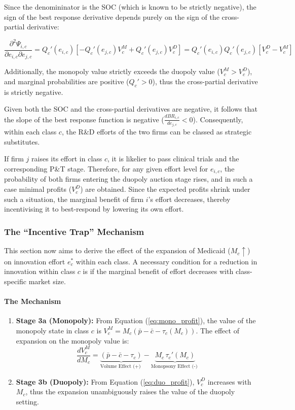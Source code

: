 \documentclass[12pt]{article}
\begin{document}
Since the denomininator is the SOC (which is known to be strictly negative), the sign of the best response derivative depends purely on the sign of the cross-partial derivative:

\begin{equation}
    \frac{\partial^2 \Psi_{i,c}}{\partial e_{i,c} \partial e_{j,c}} = Q_c'(e_{i,c}) \left[ -Q_c'(e_{j,c}) V_c^M + Q_c'(e_{j,c}) V_c^D \right] = Q_c'(e_{i,c}) Q_c'(e_{j,c}) [V_c^D - V_c^M]
\end{equation}

Additionally, the monopoly value strictly exceeds the duopoly value ($V_c^M > V_c^D$), and marginal probabilities are positive ($Q_c' > 0$), thus the cross-partial derivative is strictly negative. 

Given both the SOC and the cross-partial derivatives are negative, it follows that the slope of the best response function is negative ($\frac{d BR_{i,c}}{d e_{j,c}} < 0$). Consequently, within each class $c$, the R\&D efforts of the two firms can be classed as strategic substitutes. 

If firm $j$ raises its effort in class $c$, it is likelier to pass clinical trials and the corresponding P\&T stage. Therefore, for any given effort level for $e_{i,c}$, the probability of both firms entering the duopoly auction stage rises, and in such a case minimal profits ($V_c^D$) are obtained. Since the expected profits shrink under such a situation, the marginal benefit of firm $i$'s effort decreases, thereby incentivising it to best-respond by lowering its own effort.

\subsubsection{The ``Incentive Trap'' Mechanism}
This section now aims to derive the effect of the expansion of Medicaid ($M_c \uparrow$) on innovation effort $e_c^*$ within each class. A necessary condition for a reduction in innovation within class $c$ is if the marginal benefit of effort decreases with class-specific market size.

\paragraph{The Mechanism}
\begin{enumerate}
    \item \textbf{Stage 3a (Monopoly):} From Equation (\ref{eq:mono_profit}), the value of the monopoly state in class $c$ is $V_c^M = M_c(\bar{p} - \bar{c} - \tau_c(M_c))$. The effect of expansion on the monopoly value is:
    \begin{equation} \label{eq:dVM}
        \frac{d V_c^M}{d M_c} = \underbrace{(\bar{p} - \bar{c} - \tau_c)}_{\text{Volume Effect (+) }} - \underbrace{M_c \, \tau_c'(M_c)}_{\text{Monopsony Effect (-) }}
    \end{equation}
    \item \textbf{Stage 3b (Duopoly):} From Equation (\ref{eq:duo_profit}), $V_c^D$ increases with $M_c$, thus the expansion unambiguously raises the value of the duopoly setting.
\end{enumerate}
\end{document}
